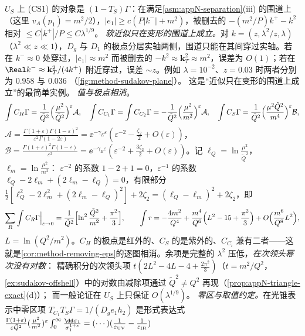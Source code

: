 \begin{example}
$U_S$ 上 (CS1) 的对象是 $(1-T_S)\Gamma$：在满足\cref{asm:appN-separation}(iii) 的围道上（这里 $v_A(p_1)=m^2/2$），$|e_1|\ge c(P|k^-|+m^2)$，被删去的 $-(m^2/P)k^+-k^2$ 相对 $\le C|k^+|/P\le C\lambda^{1/9}$。
\emph{软近似只在变形的围道上成立。}对 $k=(z,\lambda^2/z,\lambda)$（$\lambda^2\ll z\ll1$），$D_g$ 与 $D_1$ 的极点分居实轴两侧，围道只能在其间穿过实轴。若在 $k^-\approx0$ 处穿过，$|e_1|\approx m^2$
而被删去的 $-k^2\approx\mathbf k_T^2\approx m^2$，误差为 $O(1)$；若在 $\Real k^-\approx\mathbf k_T^2/(4k^+)$ 附近穿过，误差 $\sim z$。例如 $\lambda=10^{-2}$、$z=0.03$ 时两者分别为 $0.958$ 与 $0.036$
（\cref{fig:method-sudakov-plane}）。%
这是“近似只在变形的围道上成立”的最简单实例。
\emph{值与极点相消}。
\begin{equation}\label{eq:method-tri-values}
\int C_H\Gamma=\frac{1}{\tilde Q^2}\Bigl(\frac{\mu^2}{\tilde Q^2}\Bigr)^{\varepsilon}\mathcal A,\quad
\int C_{C_1}\Gamma=\int C_{C_2}\Gamma=-\frac{1}{\tilde Q^2}\Bigl(\frac{\mu^2}{m^2}\Bigr)^{\varepsilon}\mathcal A,\quad
\int C_S\Gamma=\frac{1}{\tilde Q^2}\Bigl(\frac{\mu^2\tilde Q^2}{m^4}\Bigr)^{\varepsilon}\mathcal B,
\end{equation}
$\mathcal A=\frac{\Gamma(1+\varepsilon)\Gamma(1-\varepsilon)^2}{\varepsilon^2\Gamma(1-2\varepsilon)}=\ee^{-\gamma_E\varepsilon}(\varepsilon^{-2}-\frac{\zeta_2}2+O(\varepsilon))$，
$\mathcal B=\frac{\Gamma(1+\varepsilon)^2\Gamma(1-\varepsilon)}{\varepsilon^2}=\ee^{-\gamma_E\varepsilon}(\varepsilon^{-2}+\frac{3\zeta_2}2+O(\varepsilon))$。记 $\ell_Q=\ln\frac{\mu^2}{\tilde Q^2}$，$\ell_m=\ln\frac{\mu^2}{m^2}$：
$\varepsilon^{-2}$ 的系数 $1-2+1=0$，$\varepsilon^{-1}$ 的系数 $\ell_Q-2\ell_m+(2\ell_m-\ell_Q)=0$，有限部分 $\frac12[\ell_Q^2-2\ell_m^2+(2\ell_m-\ell_Q)^2]+2\zeta_2=(\ell_Q-\ell_m)^2+2\zeta_2$，即
\begin{equation}\label{eq:method-tri-sum}
\sum_R\int C_R\Gamma\Big|_{\varepsilon\to0}=\frac1{\tilde Q^2}\Bigl[\ln^2\frac{\tilde Q^2}{m^2}+\frac{\pi^2}3\Bigr],\qquad
\int r=-\frac{4m^2}{Q^4}+\frac{m^4}{Q^6}\Bigl(L^2-15+\frac{\pi^2}3\Bigr)+O\Bigl(\frac{m^6}{Q^8}L^2\Bigr),
\end{equation}
$L=\ln(Q^2/m^2)$。$C_H$ 的极点是红外的、$C_S$ 的是紫外的、$C_{C_i}$ 兼有二者——这就是\cref{cor:method-removing-eps}的逐图相消。余项是完整的 $\lambda^2$ 压低，\emph{在次领头幂次没有对数}：
精确积分的次领头项 $t(2L^2-4L-4+\frac{2\pi^2}3)$（$t=m^2/Q^2$，\cref{ex:sudakov-offshell}）中的对数由减除项通过 $\tilde Q^2\ne Q^2$ 再现（\cref{prop:appN-triangle-exact}(d)）；
而一般论证在 $U_S$ 上只保证 $O(\lambda^{1/9})$。
\emph{零区与取值约定。}在光锥表示中零区项 $T_{C_1}T_S\Gamma=1/(D_ge_1h_2)$ 是形式表达式 $\frac{\Gamma(1+\varepsilon)}{\varepsilon\tilde Q^2}(\frac{\mu^2}{m^2})^\varepsilon\int_0^\infty\frac{\dd\sigma_1}{\sigma_1^{1+\varepsilon}}=(\cdots)(\frac1{\varepsilon_{\rm UV}}-\frac1{\varepsilon_{\rm IR}})$

\end{example}
